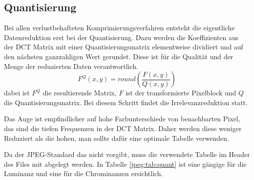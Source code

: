 \subsection{Quantisierung
\label{jpeg:subsection:quantisierung}}
Bei allen verlustbehafteten Komprimierungsverfahren entsteht die eigentliche Datenreduktion erst bei der Quantisierung.
Dazu werden die Koeffizienten aus der DCT Matrix mit einer Quantisierungsmatrix elementweise dividiert und auf den nächsten ganzzahligen Wert gerundet.
Diese ist für die Qualität und der Menge der reduzierten Daten verantwortlich.
\begin{equation}
    F^Q(x,y)
    =
    round \left(
    \frac{F(x,y)}{Q(x,y)}
    \right)
\end{equation}
dabei ist \(F^Q\) die resultierende Matrix, \(F\) ist der transformierte Pixelblock und \(Q\) die Quantisierungsmatrix.
Bei diesem Schritt findet die Irrelevanzreduktion statt.

Das Auge ist empfindlicher auf hohe Farbunterschiede von benachbarten Pixel, das sind die tiefen Frequenzen in der DCT Matrix.
Daher werden diese weniger Reduziert als die hohen, man sollte dafür eine optimale Tabelle verwenden.

Da der JPEG-Standard das nicht vorgibt, muss die verwendete Tabelle im Header des Files mit abgelegt werden.
In Tabelle \ref{jpeg:tab:quant} ist eine gängige für die Luminanz und eine für die Chrominanzen ersichtlich.

